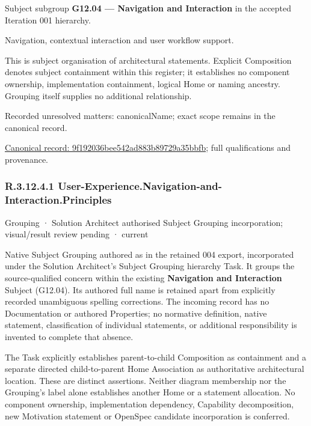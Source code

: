 Subject subgroup \textbf{G12.04 — Navigation and Interaction} in the accepted Iteration 001 hierarchy.



Navigation, contextual interaction and user workflow support.



This is subject organisation of architectural statements. Explicit Composition denotes subject containment within this register; it establishes no component ownership, implementation containment, logical Home or naming ancestry. Grouping itself supplies no additional relationship.


{\small Recorded unresolved matters: canonicalName; exact scope remains in the canonical record.}\par
{\footnotesize \href{../../../../continuum/grouping/9f192036bee542ad883b89729a35bbfb.md}{Canonical record: 9f192036bee542ad883b89729a35bbfb}; full qualifications and provenance.}\par
\subsubsection*{R.3.12.4.1 User-Experience.Navigation-and-Interaction.Principles}
\label{navigation:R.3.12.4.1}

\label{element:5120fbb391e24b3f941d8a5cc347a1fd}
{\small Grouping · Solution Architect authorised Subject Grouping incorporation; visual/result review pending · current}\par

Native Subject Grouping authored as \texttt{} in the retained 004 export,
incorporated under the Solution Architect's Subject Grouping hierarchy Task.
It groups the source-qualified \texttt{} concern within
the existing \textbf{Navigation and Interaction} Subject (G12.04). Its authored full name
is retained apart from explicitly recorded unambiguous spelling corrections.
The incoming record has no Documentation or authored Properties; no normative
definition, native statement, classification of individual statements, or
additional responsibility is invented to complete that absence.



The Task explicitly establishes parent-to-child Composition as containment and
a separate directed child-to-parent Home Association as authoritative architectural
location. These are distinct assertions. Neither diagram membership nor the
Grouping's label alone establishes another Home or a statement allocation.
No component ownership, implementation dependency, Capability decomposition,
new Motivation statement or OpenSpec candidate incorporation is conferred.



